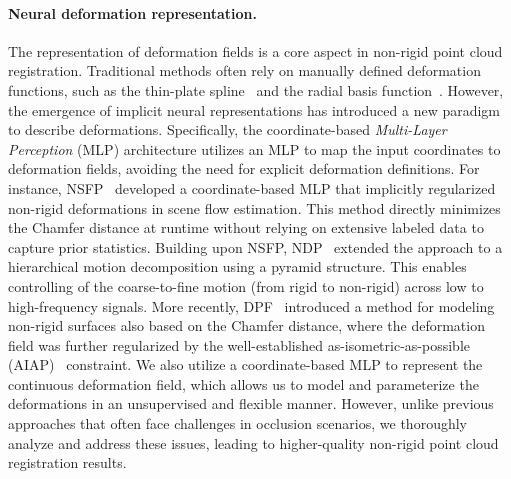 \paragraph{Neural deformation representation.}  The representation of deformation fields is a core aspect in non-rigid point cloud registration. Traditional methods often rely on manually defined deformation functions, such as the thin-plate spline~\citep{bookstein1989principal} and the radial basis function~\citep{yuille1989mathematical}. However, the emergence of implicit neural representations has introduced a new paradigm to describe deformations. Specifically, the coordinate-based \emph{Multi-Layer Perception} (MLP) architecture utilizes an MLP to map the input coordinates to deformation fields, avoiding the need for explicit deformation definitions. For instance, NSFP~\citep{li2021neural} developed a coordinate-based MLP that implicitly regularized non-rigid deformations in scene flow estimation. This method directly minimizes the Chamfer distance at runtime without relying on extensive labeled data to capture prior statistics. Building upon NSFP, NDP~\citep{li2022non} extended the approach to a hierarchical motion decomposition using a pyramid structure. This enables controlling of the coarse-to-fine motion (from rigid to non-rigid) across low to high-frequency signals. More recently, DPF~\citep{10377509} introduced a method for modeling non-rigid surfaces also based on the Chamfer distance, where the deformation field was further regularized by the well-established as-isometric-as-possible (AIAP)~\citep{kilian2007geometric} constraint. %
We also utilize a coordinate-based MLP to represent the continuous deformation field, which allows us to model and parameterize the deformations in an unsupervised and flexible manner. However, unlike previous approaches that often face challenges in occlusion scenarios, we thoroughly analyze and address these issues, leading to higher-quality non-rigid point cloud registration results.